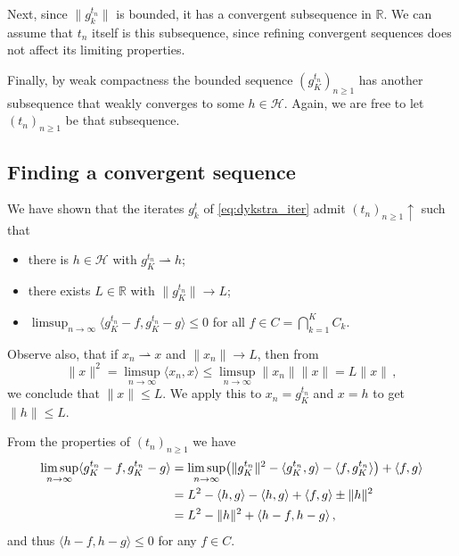 \documentclass[a4paper]{article}
\newcommand{\Hcal}{\mathcal{H}}
\newcommand{\real}{\mathbb{R}}
\begin{document}
Next, since $\|g^{t_n}_k\|$ is bounded, it has a convergent subsequence in $\real$.
We can assume that $t_n$ itself is this subsequence, since refining convergent
sequences does not affect its limiting properties.

Finally, by weak compactness the bounded sequence $(g^{t_n}_K)_{n\geq 1}$ has another
subsequence that weakly converges to some $h \in \Hcal$. Again, we are free to let
$(t_n)_{n\geq 1}$ be that subsequence.



\subsection*{Finding a convergent sequence} %
\label{sub:finding_a_convergent_sequence}

We have shown that the iterates $g^t_k$ of \eqref{eq:dykstra_iter} admit
$(t_n)_{n \geq 1} \uparrow$ such that
\begin{itemize}
  \item there is $h\in \Hcal$ with $g^{t_n}_K \rightharpoonup h$;
  \item there exists $L \in \real$ with $\|g^{t_n}_K\| \to L$;
  \item $\limsup_{n\to \infty} \langle g^{t_n}_K - f, g^{t_n}_K - g \rangle \leq 0$
  for all $f\in C = \bigcap_{k=1}^K C_k$.
\end{itemize}
Observe also, that if $x_n \rightharpoonup x$ and $\|x_n\| \to L$, then from
\begin{equation*}
  \|x\|^2
    = \limsup_{n\to \infty} \langle x_n, x\rangle
    \leq \limsup_{n\to \infty} \|x_n\| \|x\|
    = L \|x\|
    \,,
\end{equation*}
we conclude that $\|x\| \leq L$. We apply this to $x_n = g^{t_n}_K$ and $x = h$ to
get $\|h\|\leq L$.

From the properties of $(t_n)_{n\geq1}$ we have
\begin{align} \label{eq:weak_lim_equ}
  \limsup_{n\to \infty}
    \langle g^{t_n}_K - f, g^{t_n}_K - g \rangle
    &= \limsup_{n\to \infty} \bigl(
        \|g^{t_n}_K\|^2 - \langle g^{t_n}_K, g \rangle - \langle f, g^{t_n}_K \rangle
      \bigr) + \langle f, g \rangle
    \notag \\
    &= L^2 - \langle h, g \rangle - \langle h, g \rangle
      + \langle f, g \rangle \pm \|h\|^2
    \notag \\
    &= L^2 - \|h\|^2 + \langle h - f, h - g \rangle
  \,,
\end{align}
and thus $\langle h - f, h - g \rangle \leq 0$ for any $f \in C$.
\end{document}
